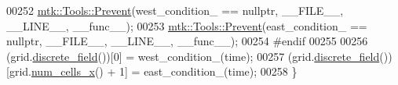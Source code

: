 \begin{DoxyCode}
00252   \hyperlink{classmtk_1_1Tools_a332324c6f25e66be9dff48c5987a3b9f}{mtk::Tools::Prevent}(west\_condition\_ == \textcolor{keyword}{nullptr}, \_\_FILE\_\_, \_\_LINE\_\_, \_\_func\_\_);
00253   \hyperlink{classmtk_1_1Tools_a332324c6f25e66be9dff48c5987a3b9f}{mtk::Tools::Prevent}(east\_condition\_ == \textcolor{keyword}{nullptr}, \_\_FILE\_\_, \_\_LINE\_\_, \_\_func\_\_);
00254 \textcolor{preprocessor}{  #endif}
00255 
00256   (grid.\hyperlink{classmtk_1_1UniStgGrid1D_ab9c3f9ee2ac76a351b01e4abfede4d19}{discrete\_field}())[0] = west\_condition\_(time);
00257   (grid.\hyperlink{classmtk_1_1UniStgGrid1D_ab9c3f9ee2ac76a351b01e4abfede4d19}{discrete\_field}())[grid.\hyperlink{classmtk_1_1UniStgGrid1D_af1b3729d8afa07be5b2775ed68015b80}{num\_cells\_x}() + 1] = east\_condition\_(time);
00258 \}
\end{DoxyCode}
